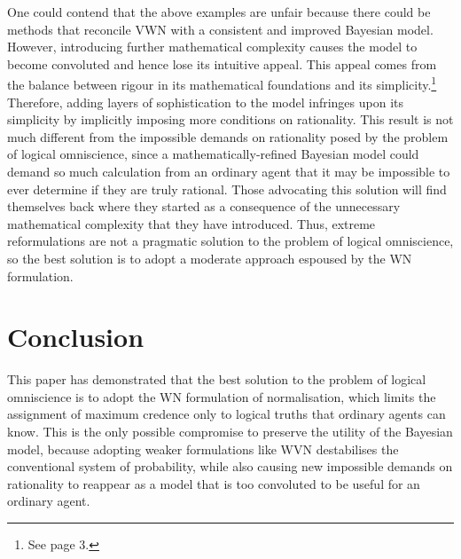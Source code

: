 \documentclass[12pt]{article}
\begin{document}
One could contend that the above examples are unfair because there could be methods that reconcile VWN with a consistent and improved Bayesian model. However, introducing further mathematical complexity causes the model to become convoluted and hence lose its intuitive appeal. This appeal comes from the balance between rigour in its mathematical foundations and its simplicity.\footnote{See page 3.} Therefore, adding layers of sophistication to the model infringes upon its simplicity by implicitly imposing more conditions on rationality. This result is not much different from the impossible demands on rationality posed by the problem of logical omniscience, since a mathematically-refined Bayesian model could demand so much calculation from an ordinary agent that it may be impossible to ever determine if they are truly rational. Those advocating this solution will find themselves back where they started as a consequence of the unnecessary mathematical complexity that they have introduced. Thus, extreme reformulations are not a pragmatic solution to the problem of logical omniscience, so the best solution is to adopt a moderate approach espoused by the WN formulation.
\section{Conclusion}
This paper has demonstrated that the best solution to the problem of logical omniscience is to adopt the WN formulation of normalisation, which limits the assignment of maximum credence only to logical truths that ordinary agents can know. This is the only possible compromise to preserve the utility of the Bayesian model, because adopting weaker formulations like WVN destabilises the conventional system of probability, while also causing new impossible demands on rationality to reappear as a model that is too convoluted to be useful for an ordinary agent.
\pagebreak
\printbibliography
\end{document}
